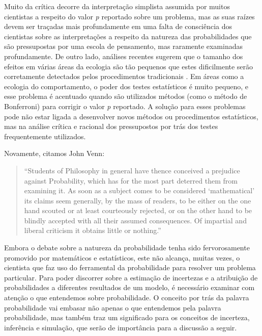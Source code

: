 Muito da crítica decorre da interpretação
simplista assumida por muitos cientistas a respeito do valor {\em p} reportado sobre um problema, mas as suas raízes devem
ser traçadas mais profundamente em uma falta de consciência dos cientistas sobre as interpretações a respeito da natureza
das probabilidades que são pressupostas por uma escola de pensamento, mas raramente examinadas profundamente. 
De outro lado, análises recentes sugerem que o tamanho dos efeitos em várias áreas da ecologia são tão pequenos que estes
dificilmente serão corretamente detectados pelos procedimentos tradicionais \citep{Jennions03}. Em áreas como a ecologia do
comportamento, o poder dos testes estatísticos é muito pequeno, e esse problema é acentuado quando são utilizados métodos
(como o método de Bonferroni) para corrigir o valor {\em p} reportado. A solução para esses problemas pode não estar ligada
a desenvolver novos métodos ou procedimentos estatísticos, mas na análise crítica e racional dos pressupostos por trás
dos testes frequentemente utilizados.

Novamente, citamos John Venn:

\begin{quote}
``Students of Philosophy in general have thence conceived a prejudice against Probability, which has for the most part
deterred them from examining it. As soon as a subject comes to be considered `mathematical' its claims seem generally,
by the mass of readers, to be either on the one hand scouted or at least courteously rejected, or on the other hand
to be blindly accepted with all their assumed consequences. Of impartial and liberal criticism it obtains little or nothing.''
\citep{Venn1866}
\end{quote}

Embora o debate sobre a natureza da probabilidade tenha sido fervorosamente promovido por matemáticos e estatísticos,
este não alcança, muitas vezes, o cientista que faz uso do ferramental da probabilidade para resolver um problema particular.
Para poder discorrer sobre a estimação de incertezas e a atribuição de probabilidades a diferentes resultados de um modelo,
é necessário examinar com atenção o que entendemos sobre probabilidade. O conceito por trás da palavra probabilidade vai
embasar não apenas o que entendemos pela palavra probabilidade, mas também traz um significado para os conceitos de
incerteza, inferência e simulação, que serão de importância para a discussão a seguir. 

